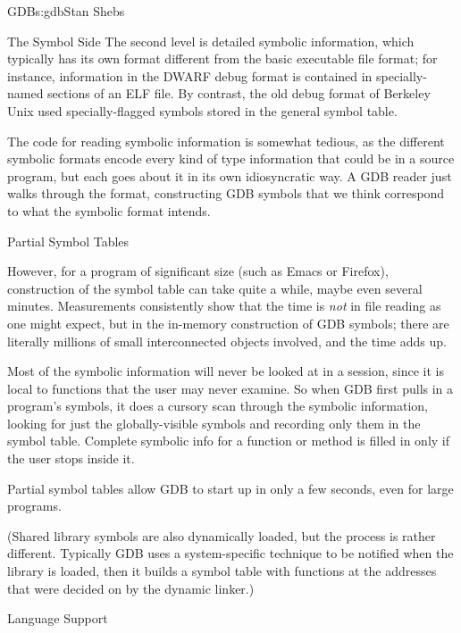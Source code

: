 \begin{aosachapter}{GDB}{s:gdb}{Stan Shebs}
\begin{aosasect1}{The Symbol Side}
The second level is detailed symbolic information, which typically has
its own format different from the basic executable file format; for
instance, information in the DWARF debug format is contained in
specially-named sections of an ELF file.  By contrast, the old
 debug format of Berkeley Unix used specially-flagged
symbols stored in the general symbol table.

The code for reading symbolic information is somewhat tedious, as the
different symbolic formats encode every kind of type information that
could be in a source program, but each goes about it in its own
idiosyncratic way.  A GDB reader just walks through the format,
constructing GDB symbols that we think correspond to what the symbolic
format intends.

\end{aosasect1}

\begin{aosasect2}{Partial Symbol Tables}

However, for a program of significant size (such as Emacs or Firefox),
construction of the symbol table can take quite a while, maybe even
several minutes.  Measurements consistently show that the time is
{\em not} in file reading as one might expect, but in the in-memory
construction of GDB symbols; there are literally millions of small
interconnected objects involved, and the time adds up.

Most of the symbolic information will never be looked at in a session,
since it is local to functions that the user may never examine.  So
when GDB first pulls in a program's symbols, it does a cursory scan
through the symbolic information, looking for just the
globally-visible symbols and recording only them in the symbol table.
Complete symbolic info for a function or method is filled in only if
the user stops inside it.

Partial symbol tables allow GDB to start up in only a few seconds, even
for large programs.

(Shared library symbols are also dynamically loaded, but the process
is rather different.  Typically GDB uses a system-specific technique
to be notified when the library is loaded, then it builds a symbol
table with functions at the addresses that were decided on by the
dynamic linker.)

\end{aosasect2}

\begin{aosasect2}{Language Support}


\end{aosasect2}
\end{aosachapter}
